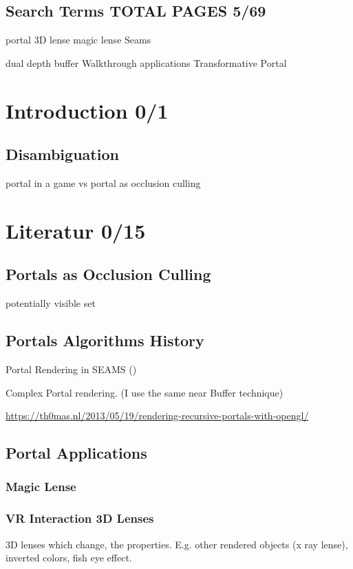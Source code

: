 
\subsection*{Search Terms TOTAL PAGES 5/69}
portal
3D lense
magic lense
Seams

dual depth buffer
Walkthrough applications
Transformative Portal
\section{Introduction 0/1}

\subsection{Disambiguation}
portal in a game
vs
portal as occlusion culling

\section{Literatur 0/15}

\subsection{Portals as Occlusion Culling}
potentially visible set
\cite{luebke:1995:portals}
\cite{yang:2014:walkthrough}

\subsection{Portals Algorithms History}


Portal Rendering in SEAMS (\cite{schmalstieg:1999:sewing})

Complex Portal rendering. (I use the same near Buffer technique) \cite{ lowe:2005:technique}


\url{https://th0mas.nl/2013/05/19/rendering-recursive-portals-with-opengl/}
\subsection{Portal Applications}

\subsubsection{Magic Lense}
\cite{viega:1996:3d}


\subsubsection{VR Interaction 3D Lenses}
\cite{borst:2009:real}
3D lenses which change, the properties. E.g. other rendered objects (x ray lense), inverted colors, fish eye effect.

